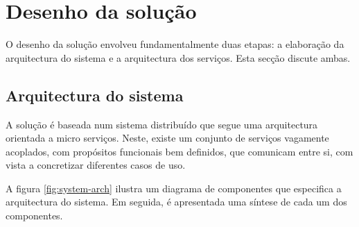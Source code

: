 \begin{table}[htb]
    \centering
    \caption{Constrangimentos e pressupostos da solução}
    \label{tab:cp}
\end{table}

\section{Desenho da solução}

O desenho da solução envolveu fundamentalmente duas etapas: a elaboração da arquitectura do sistema e a arquitectura dos serviços. Esta secção discute ambas.

\subsection{Arquitectura do sistema}

A solução é baseada num sistema distribuído que segue uma arquitectura orientada a micro serviços. Neste, existe um conjunto de serviços vagamente acoplados, com propósitos funcionais bem definidos, que comunicam entre si, com vista a concretizar diferentes casos de uso. 

A figura \ref{fig:system-arch} ilustra um diagrama de componentes que especifica a arquitectura do sistema. Em seguida, é apresentada uma síntese de cada um dos componentes.

